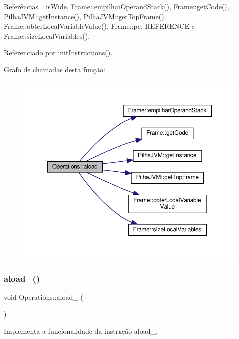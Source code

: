 Referências \+\_\+is\+Wide, Frame\+::empilhar\+Operand\+Stack(), Frame\+::get\+Code(), Pilha\+J\+V\+M\+::get\+Instance(), Pilha\+J\+V\+M\+::get\+Top\+Frame(), Frame\+::obter\+Local\+Variable\+Value(), Frame\+::pc, R\+E\+F\+E\+R\+E\+N\+CE e Frame\+::size\+Local\+Variables().



Referenciado por init\+Instructions().

Grafo de chamadas desta função\+:\nopagebreak
\begin{figure}[H]
\begin{center}
\leavevmode
\includegraphics[width=350pt]{classOperations_a2f5c13146658e71de665c3b32ebed8c9_cgraph}
\end{center}
\end{figure}
\mbox{\label{classOperations_a9d821a16ef0681755717e8c4f740f6d0}} 
\subsubsection{\texorpdfstring{aload\+\_()}{aload\_0()}}
{\footnotesize\ttfamily void Operations\+::aload\+\_ (\begin{DoxyParamCaption}{ }\end{DoxyParamCaption})\hspace{0.3cm}{\ttfamily [private]}}



Implementa a funcionalidade da instrução aload\+\_. 



